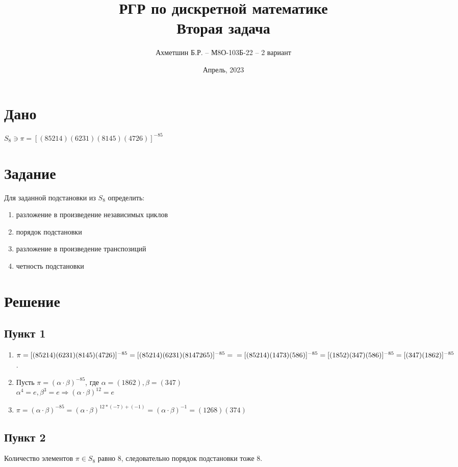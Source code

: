 \documentclass{article}
\title{РГР по дискретной математике\\Вторая задача}
\author{Ахметшин Б.Р. -- М8О-103Б-22 -- 2 вариант}
\date{Апрель, 2023}
\begin{document}
\maketitle


\section*{Дано}
$S_8 \ni \pi = [(85214)(6231)(8145)(4726)]^{-85}$ 

\section*{Задание}
Для заданной подстановки из $S_8$ определить:
\begin{enumerate}
    \item разложение в произведение независимых циклов
    \item порядок подстановки
    \item разложение в произведение транспозиций
    \item четность подстановки
\end{enumerate}


\section*{Решение}
\subsection*{Пункт 1}
\begin{enumerate}
\item $\pi = [(85214)(6231)(8145)(4726)]^{-85} = [(85214)(6231)(8147265)]^{-85} = \\
= [(85214)(1473)(586)]^{-85} = [(1852)(347)(586)]^{-85} 
= [(347)(1862)]^{-85} $.

\item Пусть $\pi = (\alpha \cdot \beta)^{-85}$, где $\alpha = (1862), \beta = (347)$ \\
$\alpha^{4} = e, \beta^{3} = e \Rightarrow (\alpha \cdot \beta)^{12} = e$

\item $\pi = (\alpha \cdot \beta)^{-85} = (\alpha \cdot \beta)^{12 * (-7) + (-1)} = (\alpha \cdot \beta)^{-1} = (1268)(374)$

\end{enumerate}

\subsection*{Пункт 2}
Количество элементов $\pi \in S_8$ равно 8, следовательно порядок подстановки тоже $8$.
\end{document}
